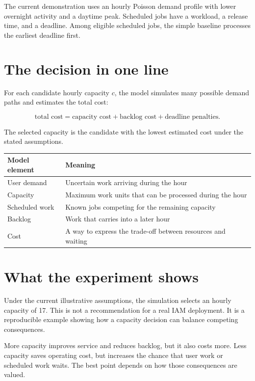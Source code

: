 \documentclass[11pt]{article}
\begin{document}
The current demonstration uses an hourly Poisson demand profile with lower
overnight activity and a daytime peak. Scheduled jobs have a workload, a
release time, and a deadline. Among eligible scheduled jobs, the simple
baseline processes the earliest deadline first.

\section*{The decision in one line}

For each candidate hourly capacity $c$, the model simulates many possible
demand paths and estimates the total cost:

\begin{equation*}
  \text{total cost} = \text{capacity cost}
  + \text{backlog cost}
  + \text{deadline penalties}.
\end{equation*}

The selected capacity is the candidate with the lowest estimated cost under
the stated assumptions.

\begin{center}
\renewcommand{\arraystretch}{1.35}
\begin{tabular}{p{} p{}}
\hline
\textbf{Model element} & \textbf{Meaning}\\
\hline
User demand & Uncertain work arriving during the hour\\
Capacity & Maximum work units that can be processed during the hour\\
Scheduled work & Known jobs competing for the remaining capacity\\
Backlog & Work that carries into a later hour\\
Cost & A way to express the trade-off between resources and waiting\\
\hline
\end{tabular}
\end{center}

\section*{What the experiment shows}

Under the current illustrative assumptions, the simulation selects an hourly
capacity of 17. This is not a recommendation for a real IAM deployment. It is
a reproducible example showing how a capacity decision can balance competing
consequences.

More capacity improves service and reduces backlog, but it also costs more.
Less capacity saves operating cost, but increases the chance that user work or
scheduled work waits. The best point depends on how those consequences are
valued.
\end{document}
